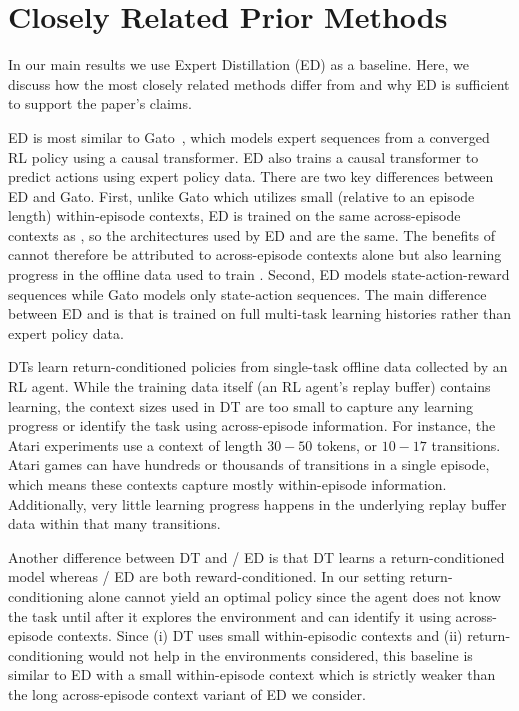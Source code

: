 \section{Closely Related Prior Methods}
\label{app:baselines}

In our main results we use Expert Distillation (ED) as a baseline. Here, we discuss how the most closely related methods differ from \name and why ED is sufficient to support the paper's claims. 

 ED is most similar to Gato~\citep{reed2022gato}, which models expert sequences from a converged RL policy using a causal transformer. ED also trains a causal transformer to predict actions using expert policy data. There are two key differences between ED and Gato. First, unlike Gato which utilizes small (relative to an episode length) within-episode contexts, ED is trained on the same across-episode contexts as \namenospace, so the architectures used by ED and \name are the same. The benefits of \name cannot therefore be attributed to across-episode contexts alone but also learning progress in the offline data used to train \namenospace. Second, ED models state-action-reward sequences while Gato models only state-action sequences. The main difference between ED and \name is that \name is trained on full multi-task learning histories rather than expert policy data.

 DTs learn return-conditioned policies from single-task offline data collected by an RL agent. While the training data itself (an RL agent's replay buffer) contains learning, the context sizes used in DT are too small to capture any learning progress or identify the task using across-episode information. For instance, the Atari experiments use a context of length $30-50$ tokens, or $10-17$ transitions. Atari games can have hundreds or thousands of transitions in a single episode, which means these contexts capture mostly within-episode information. Additionally, very little learning progress happens in the underlying replay buffer data within that many transitions. 

Another difference between DT and \name / ED is that DT learns a return-conditioned model whereas \name / ED are both reward-conditioned. In our setting return-conditioning alone cannot yield an optimal policy since the agent does not know the task until after it explores the environment and can identify it using across-episode contexts. Since (i) DT uses small within-episodic contexts and (ii) return-conditioning would not help in the environments considered, this baseline is similar to ED with a small within-episode context which is strictly weaker than the long across-episode context variant of ED we consider.


